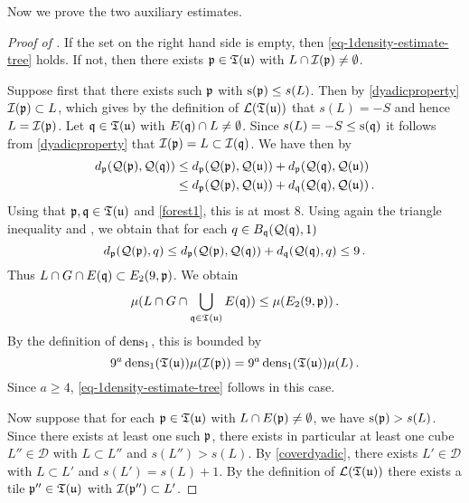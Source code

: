 Now we prove the two auxiliary estimates.

\begin{proof}[Proof of ]
    \leanok
    If the set on the right hand side is empty, then \eqref{eq-1density-estimate-tree} holds. If not, then there exists ${\mathfrak p} \in {\mathfrak T}({\mathfrak u})$ with $L \cap {\mathcal{I}}({\mathfrak p}) \ne \emptyset$.

    Suppose first that there exists such ${\mathfrak p}$ with ${\mathrm{s}}({\mathfrak p}) \le s(L)$. Then by \eqref{dyadicproperty} ${\mathcal{I}}({\mathfrak p}) \subset L$, which gives by the definition of $\mathcal{L}({\mathfrak T}({\mathfrak u}))$ that $s(L) = -S$ and hence $L = {\mathcal{I}}({\mathfrak p})$. Let ${\mathfrak q} \in {\mathfrak T}({\mathfrak u})$ with $E({\mathfrak q}) \cap L \ne \emptyset$. Since $s(L) = -S \le {\mathrm{s}}({\mathfrak q})$ it follows from \eqref{dyadicproperty} that ${\mathcal{I}}({\mathfrak p}) = L \subset {\mathcal{I}}({\mathfrak q})$. We have then by 
    \begin{align*}
        d_{{\mathfrak p}}({\mathcal{Q}}({\mathfrak p}), {\mathcal{Q}}({\mathfrak q})) &\le d_{{\mathfrak p}}({\mathcal{Q}}({\mathfrak p}), {\mathcal{Q}}({\mathfrak u})) + d_{{\mathfrak p}}({\mathcal{Q}}({\mathfrak q}), {\mathcal{Q}}({\mathfrak u}))\\
        &\le d_{{\mathfrak p}}({\mathcal{Q}}({\mathfrak p}), {\mathcal{Q}}({\mathfrak u})) + d_{{\mathfrak q}}({\mathcal{Q}}({\mathfrak q}), {\mathcal{Q}}({\mathfrak u}))\,.
    \end{align*}
    Using that ${\mathfrak p}, {\mathfrak q} \in {\mathfrak T}({\mathfrak u})$ and \eqref{forest1}, this is at most $8$. Using again the triangle inequality and , we obtain that for each $q \in B_{{\mathfrak q}}({\mathcal{Q}}({\mathfrak q}), 1)$
    $$
        d_{{\mathfrak p}}({\mathcal{Q}}({\mathfrak p}), q) \le d_{{\mathfrak p}}({\mathcal{Q}}({\mathfrak p}), {\mathcal{Q}}({\mathfrak q})) + d_{{\mathfrak q}}({\mathcal{Q}}({\mathfrak q}), q) \le 9\,.
    $$
    Thus $L \cap G \cap E({\mathfrak q}) \subset E_2(9, {\mathfrak p})$. We obtain
    $$
        \mu(L \cap G \cap \bigcup_{{\mathfrak q} \in {\mathfrak T}({\mathfrak u})} E({\mathfrak q})) \le \mu(E_2(9, {\mathfrak p}))\,.
    $$
    By the definition of $\operatorname{\operatorname{dens}}_1$, this is bounded by
    $$
        9^a \operatorname{\operatorname{dens}}_1({\mathfrak T}({\mathfrak u})) \mu({\mathcal{I}}({\mathfrak p})) =9^a \operatorname{\operatorname{dens}}_1({\mathfrak T}({\mathfrak u})) \mu(L)\,.
    $$
    Since $a \ge 4$, \eqref{eq-1density-estimate-tree} follows in this case.

    Now suppose that for each ${\mathfrak p} \in {\mathfrak T}({\mathfrak u})$ with $L \cap E({\mathfrak p}) \ne \emptyset$, we have ${\mathrm{s}}({\mathfrak p}) > s(L)$.
    Since there exists at least one such ${\mathfrak p}$, there exists in particular at least one cube $L'' \in \mathcal{D}$ with $L \subset L''$ and $s(L'') > s(L)$.
    By \eqref{coverdyadic}, there exists $L' \in \mathcal{D}$ with $L \subset L'$ and $s(L') = s(L) + 1$.
    By the definition of $\mathcal{L}({\mathfrak T}({\mathfrak u}))$ there exists a tile ${\mathfrak p}'' \in {\mathfrak T}({\mathfrak u})$ with ${\mathcal{I}}({\mathfrak p}'') \subset L'$.


\end{proof}
